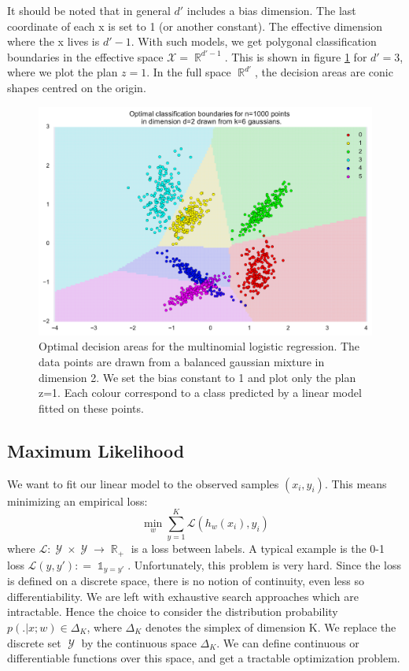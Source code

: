 \documentclass{article}
\DeclareMathOperator{\R}{\mathbb{R}}
\DeclareMathOperator{\1}{\mathbb{1}}
\DeclareMathOperator{\Y}{\mathcal{Y}}
\begin{document}
It should be noted that in general $d'$ includes a bias dimension.
The last coordinate of each x is set to 1 (or another constant).
The effective dimension where the x lives is $d'-1$.
With such models, we get polygonal classification boundaries in the effective space $\mathcal X = \R^{d'-1}$.
This is shown in figure \ref{linear classification} for $d'=3$, where we plot the plan $z=1$.
In the full space $\R^{d'}$, the decision areas are conic shapes centred on the origin.

\begin{figure}[ht]
	\label{linear classification}
	\includegraphics[width=\textwidth]{images/linear_classification.pdf}
	\caption{
	Optimal decision areas for the multinomial logistic regression.
	The data points are drawn from a balanced gaussian mixture in dimension 2.
	We set the bias constant to 1 and plot only the plan z=1.
	Each colour correspond to a class predicted by a linear model fitted on these points. 
	}
\end{figure}



 \subsection{Maximum Likelihood}

We want to fit our linear model to the observed samples $(x_i, y_i)$.
This means minimizing an empirical loss:
\begin{equation*}
	\min_w \sum_{y=1}^K \mathcal L (h_w(x_i),y_i)
\end{equation*}
where $\mathcal L: \Y \times \Y \rightarrow \R_+$ is a loss between labels.
A typical example is the 0-1 loss $\mathcal L(y, y') : = \1_{y=y'}$.
Unfortunately, this problem is very hard.
Since the loss is defined on a discrete space, there is no notion of continuity, even less so differentiability.
We are left with exhaustive search approaches which are intractable.
Hence the choice to consider the distribution probability $p( . | x ; w) \in \Delta_K$, where $\Delta_K$ denotes the simplex of dimension K.
We replace the discrete set $\Y$ by the continuous space $\Delta_K$.
We can define continuous or differentiable functions over this space, and get a tractable optimization problem.
 
\end{document}
